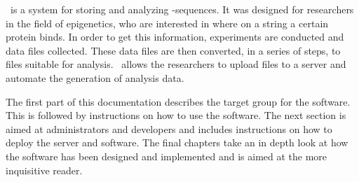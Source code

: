 

\appName\ is a system for storing and analyzing -sequences. It was designed for researchers in the field of epigenetics, who are interested in where on a  string a certain protein binds. In order to get this information, experiments are conducted and  data files collected. These data files are then converted, in a series of steps, to files suitable for analysis. \appName\ allows the researchers to upload  files to a server and automate the generation of analysis data. 

The first part of this documentation describes the target group for the software. This is followed by instructions on how to use the software. The next section is aimed at administrators and developers and includes instructions on how to deploy the server and software. The final chapters take an in depth look at how the software has been designed and implemented and is aimed at the more inquisitive reader. 

